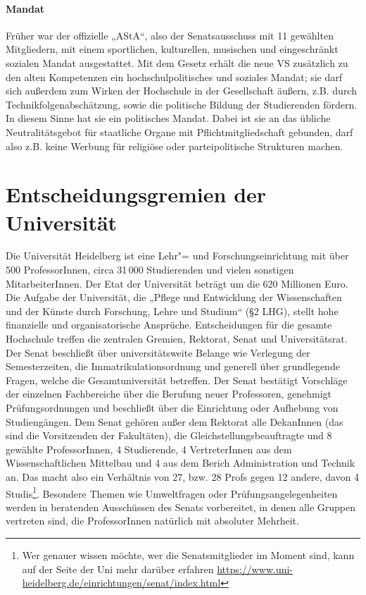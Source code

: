 \paragraph{Mandat}

Früher war der offizielle „AStA“, also der Senatsausschuss mit 11 gewählten
Mitgliedern, mit einem sportlichen, kulturellen, musischen und eingeschränkt
sozialen Mandat ausgestattet.
Mit dem Gesetz erhält die neue VS zusätzlich zu den alten Kompetenzen ein
hochschulpolitisches und soziales Mandat; sie darf sich außerdem zum Wirken der
Hochschule in der Gesellschaft äußern, z.B. durch Technikfolgenabschätzung,
sowie die politische Bildung der Studierenden fördern. In diesem Sinne hat sie
ein politisches Mandat. Dabei ist sie an das übliche Neutralitätsgebot für
staatliche Organe mit Pflichtmitgliedschaft gebunden, darf also z.B. keine
Werbung für religiöse oder parteipolitische Strukturen machen.

\section{Entscheidungsgremien der Universität}

Die Universität Heidelberg ist eine Lehr"= und Forschungseinrichtung mit über
500 ProfessorInnen, circa 31\,000 Studierenden und vielen sonstigen
MitarbeiterInnen. Der Etat der Universität beträgt um die 620 Millionen Euro.
Die Aufgabe der Universität, die „Pflege und Entwicklung der Wissenschaften und
der Künste durch Forschung, Lehre und Studium“ (§2
LHG), stellt hohe finanzielle und organisatorische Ansprüche. Entscheidungen
für die gesamte Hochschule treffen die zentralen Gremien, Rektorat, Senat und
Universitätsrat. Der Senat beschließt über universitätsweite Belange wie
Verlegung der Semesterzeiten, die Immatrikulationsordnung und generell über
grundlegende Fragen, welche die Gesamtuniversität betreffen. Der Senat
bestätigt Vorschläge der einzelnen Fachbereiche über die Berufung neuer
Professoren, genehmigt Prüfungsordnungen und beschließt über die Einrichtung
oder Aufhebung von Studiengängen. Dem Senat gehören außer dem Rektorat alle
DekanInnen (das sind die Vorsitzenden der Fakultäten), die
Gleichstellungsbeauftragte und 8 gewählte ProfessorInnen, 4 Studierende, 4
VertreterInnen aus dem Wissenschaftlichen Mittelbau und 4 aus dem Berich
Administration und Technik an. Das macht also ein Verhältnis von 27, bzw. 28
Profs gegen 12 andere, davon 4 Studis\footnote{Wer genauer wissen möchte, wer
die Senatsmitglieder im Moment sind, kann auf der Seite der Uni mehr darüber
erfahren \url{https://www.uni-heidelberg.de/einrichtungen/senat/index.html}}.
Besondere Themen wie Umweltfragen oder Prüfungsangelegenheiten werden in
beratenden Ausschüssen des Senats vorbereitet, in denen alle Gruppen vertreten
sind, die ProfessorInnen natürlich mit absoluter Mehrheit. 

